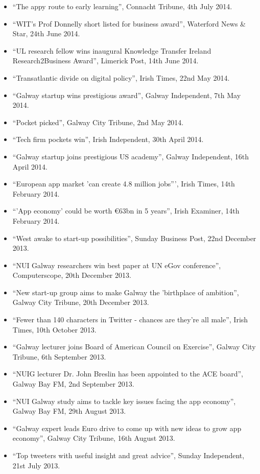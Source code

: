 \documentclass[10pt,a4paper]{res} %
\begin{document}
\begin{resume}
{\begin{itemize}
\item ``The appy route to early learning'', Connacht Tribune, 4th July 2014.
\item ``WIT's Prof Donnelly short listed for business award'', Waterford News \& Star, 24th June 2014.
\item ``UL research fellow wins inaugural Knowledge Transfer Ireland Research2Business Award'', Limerick Post, 14th June 2014.
\item ``Transatlantic divide on digital policy'', Irish Times, 22nd May 2014.
\item ``Galway startup wins prestigious award'', Galway Independent, 7th May 2014.
\item ``Pocket picked'', Galway City Tribune, 2nd May 2014.
\item ``Tech firm pockets win'', Irish Independent, 30th April 2014.
\item ``Galway startup joins prestigious US academy'', Galway Independent, 16th April 2014.
\item ``European app market 'can create 4.8 million jobs''', Irish Times, 14th February 2014.
\item ``'App economy' could be worth \euro{}63bn in 5 years'', Irish Examiner, 14th February 2014.
\item ``West awake to start-up possibilities'', Sunday Business Post, 22nd December 2013.
\item ``NUI Galway researchers win best paper at UN eGov conference'', Computerscope, 20th December 2013.
\item ``New start-up group aims to make Galway the 'birthplace of ambition'', Galway City Tribune, 20th December 2013.
\item ``Fewer than 140 characters in Twitter - chances are they're all male'', Irish Times, 10th October 2013.
\item ``Galway lecturer joins Board of American Council on Exercise'', Galway City Tribune, 6th September 2013.
\item ``NUIG lecturer Dr. John Breslin has been appointed to the ACE board'', Galway Bay FM, 2nd September 2013.
\item ``NUI Galway study aims to tackle key issues facing the app economy'', Galway Bay FM, 29th August 2013.
\item ``Galway expert leads Euro drive to come up with new ideas to grow app economy'', Galway City Tribune, 16th August 2013.
\item ``Top tweeters with useful insight and great advice'', Sunday Independent, 21st July 2013.

\end{itemize}}
\end{resume}
\end{document}
